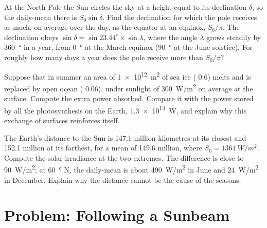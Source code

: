 \begin{exercise}[$\star\star\star$]\label{exo:g10:earth-energy-budget:13}
At the North Pole the Sun circles the sky at a height equal to its
declination $\delta$, so the daily-mean  there is $S_0 \sin
\delta$. Find the declination for which the pole receives as much, on
average over the day, as the equator at an equinox, $S_0/\pi$. The
declination obeys $\sin\delta = \sin 23.44^\circ \times \sin\lambda$, where
the angle $\lambda$ grows steadily by \qty{360}{\degree} in a year, from
\qty{0}{\degree} at the March equinox (\qty{90}{\degree} at the June
solstice). For roughly how many days a year does the pole receive more than
$S_0/\pi$?
\end{exercise}

\begin{exercise}[$\star\star\star$]\label{exo:g10:earth-energy-budget:14}
Suppose that in summer an area of \qty{1e12}{m^2} of sea ice ( 0.6)
melts and is replaced by open ocean ( 0.06), under sunlight of
\qty{300}{W/m^2} on average at the surface. Compute the extra power
absorbed. Compare it with the power stored by all the photosynthesis on
the Earth, \qty{1.3e14}{W}, and explain why this exchange of surfaces
reinforces itself.
\end{exercise}

\begin{exercise}[$\star\star\star$]\label{exo:g10:earth-energy-budget:15}
The Earth's distance to the Sun is \num{147.1} million kilometres at its
closest and \num{152.1} million at its farthest, for a mean of
\num{149.6} million, where $S_0 = \qty{1361}{W/m^2}$. Compute the solar
irradiance at the two extremes. The difference is close to
\qty{90}{W/m^2}; at \qty{60}{\degree} N, the daily-mean  is about
\qty{490}{W/m^2} in June and \qty{24}{W/m^2} in December. Explain why the
distance cannot be the cause of the seasons.
\end{exercise}

\section{Problem: Following a Sunbeam}

